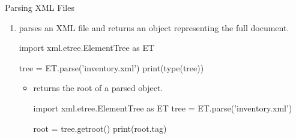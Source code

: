 \documentclass[10pt]{article}
\begin{document}
    \begin{core}{Parsing XML Files}

      \begin{enumerate}

        \item {} parses an XML file and returns an  object representing the full document.

        \begin{pyconsole}
          
          import xml.etree.ElementTree as ET

          tree = ET.parse('inventory.xml')
          print(type(tree))

        \end{pyconsole}

        \begin{itemize}

          \item {} returns the root  of a parsed  object.

          \begin{pyconsole}

            import xml.etree.ElementTree as ET
            tree = ET.parse('inventory.xml')

            root = tree.getroot()
            print(root.tag)

          \end{pyconsole}

        \end{itemize}

      \end{enumerate}

    \end{core}
\end{document}
